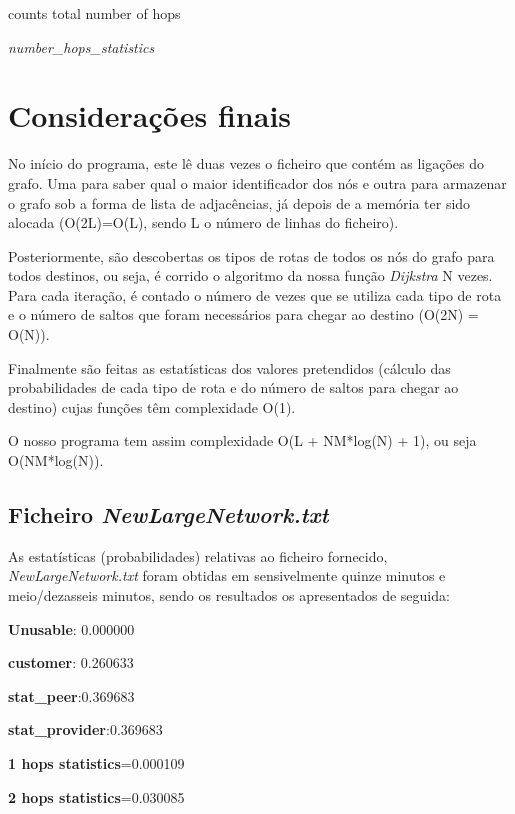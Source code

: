\documentclass[a4paper]{article}
\begin{document}
\begin{algorithm}[H]
 counts total number of hops\;
 
 
 \caption{\textit{number\_hops\_statistics}}
\end{algorithm}

\section{Considerações finais}
No início do programa, este lê duas vezes o ficheiro que contém as ligações do grafo. Uma para saber qual o maior identificador dos nós e outra para armazenar o grafo sob a forma de lista de adjacências, já depois de a memória ter sido alocada (O(2L)=O(L), sendo L o número de linhas do ficheiro).

Posteriormente, são descobertas os tipos de rotas de todos os nós do grafo para todos destinos, ou seja, é corrido o algoritmo da nossa função \textit{Dijkstra} N vezes. Para cada iteração, é contado o número de vezes que se utiliza cada tipo de rota e o número de saltos que foram necessários para chegar ao destino (O(2N) = O(N)).

Finalmente são feitas as estatísticas dos valores pretendidos (cálculo das probabilidades de cada tipo de rota e do número de saltos para chegar ao destino) cujas funções têm complexidade O(1).

O nosso programa tem assim complexidade O(L + NM*log(N) + 1), ou seja O(NM*log(N)).

\subsection{Ficheiro \textit{NewLargeNetwork.txt}}
As estatísticas (probabilidades) relativas ao ficheiro fornecido, \textit{NewLargeNetwork.txt} foram obtidas em sensivelmente quinze minutos e meio/dezasseis minutos, sendo os resultados os apresentados de seguida:

\textbf{Unusable}: 0.000000

\textbf{customer}: 0.260633

\textbf{stat\_peer}:0.369683

\textbf{stat\_provider}:0.369683

\textbf{1 hops statistics}=0.000109

\textbf{2 hops statistics}=0.030085
\end{document}
